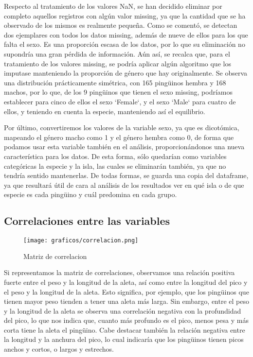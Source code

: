 \documentclass[a4paper,onecolumn]{extarticle}
\begin{document}
\begin{sloppypar}
Respecto al tratamiento de los valores NaN, se han decidido eliminar por completo aquellos registros con algún valor missing, ya que la cantidad que se ha 
observado de los mismos es realmente pequeña. Como se comentó, se detectan dos ejemplares con todos los datos missing, además de nueve de ellos para los que 
falta el sexo. Es una proporción escasa de los datos, por lo que su eliminación no supondría una gran pérdida de información. Aún así, se recalca que, para 
el tratamiento de los valores missing, se podría aplicar algún algoritmo que los imputase manteniendo la proporción de género que hay originalmente. Se observa 
una distribución prácticamente simétrica, con 165 pingüinos hembra y 168 machos, por lo que, de los 9 pingüinos que tienen el sexo missing, podríamos establecer 
para cinco de ellos el sexo `Female`, y el sexo `Male` para cuatro de ellos, y teniendo en cuenta la especie, manteniendo así el equilibrio.

Por último, convertiremos los valores de la variable sexo, ya que es dicotómica, mapeando el género macho como 1 y el género hembra como 0, de forma que 
podamos usar esta variable también en el análisis, proporcionándonos una nueva característica para los datos. De esta forma, sólo quedarían como variables 
categóricas la especie y la isla, las cuales se eliminarán también, ya que no tendría sentido mantenerlas. De todas formas, se guarda una copia del dataframe, 
ya que resultará útil de cara al análisis de los resultados ver en qué isla o de que especie es cada pingüino y cuál predomina en cada grupo.

\subsection{Correlaciones entre las variables}\label{correlaciones}
\begin{wrapfigure}[15]{l}{7cm}
    \texttt{[image: graficos/correlacion.png]}
    \small{\caption{Matriz de correlacion}}
    \label{correlacion}
\end{wrapfigure} 
Si representamos la matriz de correlaciones, observamos una relación positiva fuerte entre el peso y la longitud de la aleta, así como entre la longitud del 
pico y el peso y la longitud de la aleta. Esto significa, por ejemplo, que los pingüinos que tienen mayor peso tienden a tener una aleta más larga. Sin embargo, 
entre el peso y la longitud de la aleta se observa una correlación negativa con la profundidad del pico, lo que nos indica que, cuanto más profundo es el pico, 
menos pesa y más corta tiene la aleta el pingüino. Cabe destacar también la relación negativa entre la longitud y la anchura del pico, lo cual indicaría que 
los pingüinos tienen picos anchos y cortos, o largos y estrechos.


\end{sloppypar}
\end{document}
